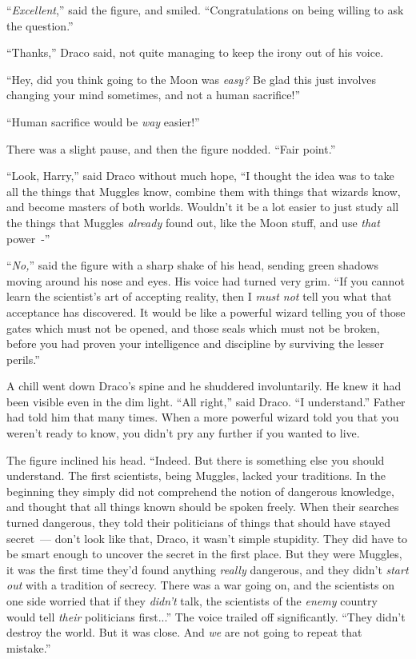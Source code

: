 ``\emph{Excellent},'' said the figure, and smiled. ``Congratulations on being willing to ask the question.''

``Thanks,'' Draco said, not quite managing to keep the irony out of his voice.

``Hey, did you think going to the Moon was \emph{easy?} Be glad this just involves changing your mind sometimes, and not a human sacrifice!''

``Human sacrifice would be \emph{way} easier!''

There was a slight pause, and then the figure nodded. ``Fair point.''

``Look, Harry,'' said Draco without much hope, ``I thought the idea was to take all the things that Muggles know, combine them with things that wizards know, and become masters of both worlds. Wouldn't it be a lot easier to just study all the things that Muggles \emph{already} found out, like the Moon stuff, and use \emph{that} power~-''

``\emph{No,}'' said the figure with a sharp shake of his head, sending green shadows moving around his nose and eyes. His voice had turned very grim. ``If you cannot learn the scientist's art of accepting reality, then I \emph{must not} tell you what that acceptance has discovered. It would be like a powerful wizard telling you of those gates which must not be opened, and those seals which must not be broken, before you had proven your intelligence and discipline by surviving the lesser perils.''

A chill went down Draco's spine and he shuddered involuntarily. He knew it had been visible even in the dim light. ``All right,'' said Draco. ``I understand.'' Father had told him that many times. When a more powerful wizard told you that you weren't ready to know, you didn't pry any further if you wanted to live.

The figure inclined his head. ``Indeed. But there is something else you should understand. The first scientists, being Muggles, lacked your traditions. In the beginning they simply did not comprehend the notion of dangerous knowledge, and thought that all things known should be spoken freely. When their searches turned dangerous, they told their politicians of things that should have stayed secret~--- don't look like that, Draco, it wasn't simple stupidity. They did have to be smart enough to uncover the secret in the first place. But they were Muggles, it was the first time they'd found anything \emph{really} dangerous, and they didn't \emph{start out} with a tradition of secrecy. There was a war going on, and the scientists on one side worried that if they \emph{didn't} talk, the scientists of the \emph{enemy} country would tell \emph{their} politicians first...'' The voice trailed off significantly. ``They didn't destroy the world. But it was close. And \emph{we} are not going to repeat that mistake.''

